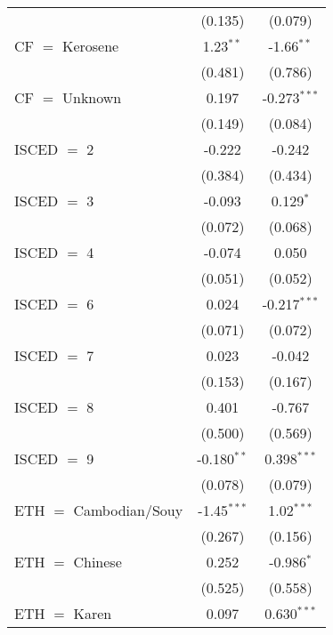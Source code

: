 \begin{table}[htbp!]
\begin{adjustbox}{width = 1\textwidth, max height = 0.95\textheight, center}
\begin{threeparttable}[b]
\begin{tabular}{lcc}
                                   & (0.135)        & (0.079)\\   
            CF $=$ Kerosene        & 1.23$^{**}$    & -1.66$^{**}$\\   
                                   & (0.481)        & (0.786)\\   
            CF $=$ Unknown         & 0.197          & -0.273$^{***}$\\   
                                   & (0.149)        & (0.084)\\   
            ISCED $=$ 2            & -0.222         & -0.242\\   
                                   & (0.384)        & (0.434)\\   
            ISCED $=$ 3            & -0.093         & 0.129$^{*}$\\   
                                   & (0.072)        & (0.068)\\   
            ISCED $=$ 4            & -0.074         & 0.050\\   
                                   & (0.051)        & (0.052)\\   
            ISCED $=$ 6            & 0.024          & -0.217$^{***}$\\   
                                   & (0.071)        & (0.072)\\   
            ISCED $=$ 7            & 0.023          & -0.042\\   
                                   & (0.153)        & (0.167)\\   
            ISCED $=$ 8            & 0.401          & -0.767\\   
                                   & (0.500)        & (0.569)\\   
            ISCED $=$ 9            & -0.180$^{**}$  & 0.398$^{***}$\\   
                                   & (0.078)        & (0.079)\\   
            ETH $=$ Cambodian/Souy & -1.45$^{***}$  & 1.02$^{***}$\\   
                                   & (0.267)        & (0.156)\\   
            ETH $=$ Chinese        & 0.252          & -0.986$^{*}$\\   
                                   & (0.525)        & (0.558)\\   
            ETH $=$ Karen          & 0.097          & 0.630$^{***}$\\   

\end{tabular}
\end{threeparttable}
\end{adjustbox}
\end{table}

